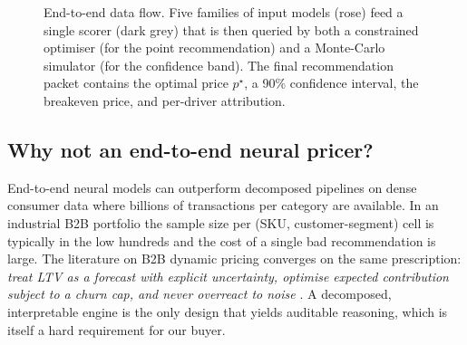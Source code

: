 \documentclass[11pt,a4paper]{article}
\begin{document}
\begin{figure}[ht]
{%
}
\caption{End-to-end data flow. Five families of input models (rose) feed a single scorer (dark grey) that is then queried by both a constrained optimiser (for the point recommendation) and a Monte-Carlo simulator (for the confidence band). The final recommendation packet contains the optimal price $p^\star$, a 90\% confidence interval, the breakeven price, and per-driver attribution.}
\label{fig:arch}
\end{figure}

\subsection{Why not an end-to-end neural pricer?}
End-to-end neural models can outperform decomposed pipelines on dense consumer data where billions of transactions per category are available. In an industrial B2B portfolio the sample size per (SKU, customer-segment) cell is typically in the low hundreds and the cost of a single bad recommendation is large. The literature on B2B dynamic pricing converges on the same prescription: \emph{treat LTV as a forecast with explicit uncertainty, optimise expected contribution subject to a churn cap, and never overreact to noise} \cite{omnibound2026b2b,influencers2025ltv,influencers2025dynamic}. A decomposed, interpretable engine is the only design that yields auditable reasoning, which is itself a hard requirement for our buyer.
\end{document}
